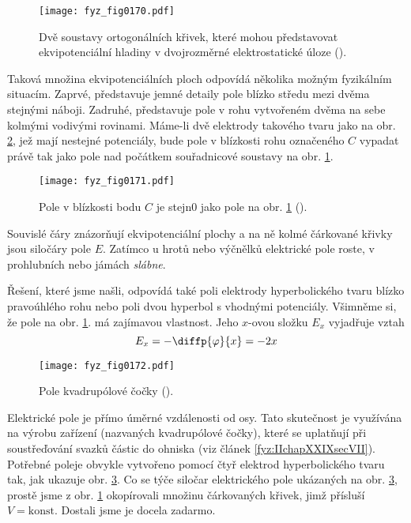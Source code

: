   \begin{figure}[ht!]  %
    \centering
    \texttt{[image: fyz\_fig0170.pdf]}
    \caption{Dvě soustavy ortogonálních křivek, které mohou představovat ekvipotenciální hladiny v 
             dvojrozměrné elektrostatické úloze 
             (\cite[s.~126]{Feynman02}).}
    \label{fyz:fig0170}
  \end{figure}

  Taková množina ekvipotenciálních ploch odpovídá několika možným fyzikálním situacím. Zaprvé,
  představuje jemné detaily pole blízko středu mezi dvěma stejnými náboji. Zadruhé, představuje pole
  v rohu vytvořeném dvěma na sebe kolmými vodivými rovinami. Máme-li dvě elektrody takového tvaru
  jako na obr. \ref{fyz:fig0171}, jež mají nestejné potenciály, bude pole v blízkosti rohu označeného
  \(C\) vypadat právě tak jako pole nad počátkem souřadnicové soustavy na obr. \ref{fyz:fig0170}.

  \begin{figure}[ht!]  %
    \centering
    \texttt{[image: fyz\_fig0171.pdf]}
    \caption{Pole v blízkosti bodu \(C\) je stejn0 jako pole na obr. \ref{fyz:fig0170}
             (\cite[s.~127]{Feynman02}).}
    \label{fyz:fig0171}
  \end{figure}

  Souvislé čáry znázorňují ekvipotenciální plochy a na ně kolmé čárkované křivky jsou siločáry pole
  \(E\). Zatímco u hrotů nebo výčnělků elektrické pole roste, v prohlubních nebo jámách
  \emph{slábne}.

  Řešení, které jsme našli, odpovídá také poli elektrody hyperbolického tvaru blízko pravoúhlého
  rohu nebo poli dvou hyperbol s vhodnými potenciály. Všimněme si, že pole na obr. \ref{fyz:fig0170}.
  má zajímavou vlastnost. Jeho \(x\)-ovou složku \(E_x\) vyjadřuje vztah
  \begin{equation*}
    E_x = - \diffp{\varphi}{x} = -2x
  \end{equation*}

  \begin{figure}[ht!]  %
    \centering
    \texttt{[image: fyz\_fig0172.pdf]}
    \caption{Pole kvadrupólové čočky (\cite[s.~127]{Feynman02}).}
    \label{fyz:fig0172}
  \end{figure}

  Elektrické pole je přímo úměrné vzdálenosti od osy. Tato skutečnost je využívána na výrobu
  zařízení (nazvaných kvadrupólové čočky), které se uplatňují při soustřeďování svazků částic do
  ohniska (viz článek \ref{fyz:IIchapXXIXsecVII}). Potřebné poleje obvykle vytvořeno pomocí čtyř
  elektrod hyperbolického tvaru tak, jak ukazuje obr. \ref{fyz:fig0172}. Co se týče siločar
  elektrického pole ukázaných na obr. \ref{fyz:fig0172}, prostě jsme z obr. \ref{fyz:fig0170}
  okopírovali množinu čárkovaných křivek, jimž přísluší \(V=\text{konst}\). Dostali jsme je docela
  zadarmo.

